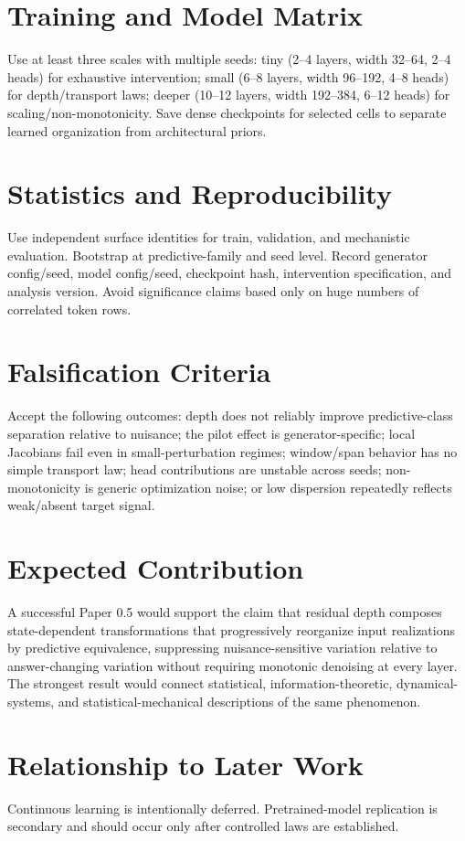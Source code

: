 \documentclass[10pt]{article}
\begin{document}
\section{Training and Model Matrix}
Use at least three scales with multiple seeds: tiny (2--4 layers, width 32--64, 2--4 heads) for exhaustive intervention; small (6--8 layers, width 96--192, 4--8 heads) for depth/transport laws; deeper (10--12 layers, width 192--384, 6--12 heads) for scaling/non-monotonicity. Save dense checkpoints for selected cells to separate learned organization from architectural priors.

\section{Statistics and Reproducibility}
Use independent surface identities for train, validation, and mechanistic evaluation. Bootstrap at predictive-family and seed level. Record generator config/seed, model config/seed, checkpoint hash, intervention specification, and analysis version. Avoid significance claims based only on huge numbers of correlated token rows.

\section{Falsification Criteria}
Accept the following outcomes: depth does not reliably improve predictive-class separation relative to nuisance; the pilot effect is generator-specific; local Jacobians fail even in small-perturbation regimes; window/span behavior has no simple transport law; head contributions are unstable across seeds; non-monotonicity is generic optimization noise; or low dispersion repeatedly reflects weak/absent target signal.

\section{Expected Contribution}
A successful Paper 0.5 would support the claim that residual depth composes state-dependent transformations that progressively reorganize input realizations by predictive equivalence, suppressing nuisance-sensitive variation relative to answer-changing variation without requiring monotonic denoising at every layer. The strongest result would connect statistical, information-theoretic, dynamical-systems, and statistical-mechanical descriptions of the same phenomenon.

\section{Relationship to Later Work}
Continuous learning is intentionally deferred. Pretrained-model replication is secondary and should occur only after controlled laws are established.
\end{document}
